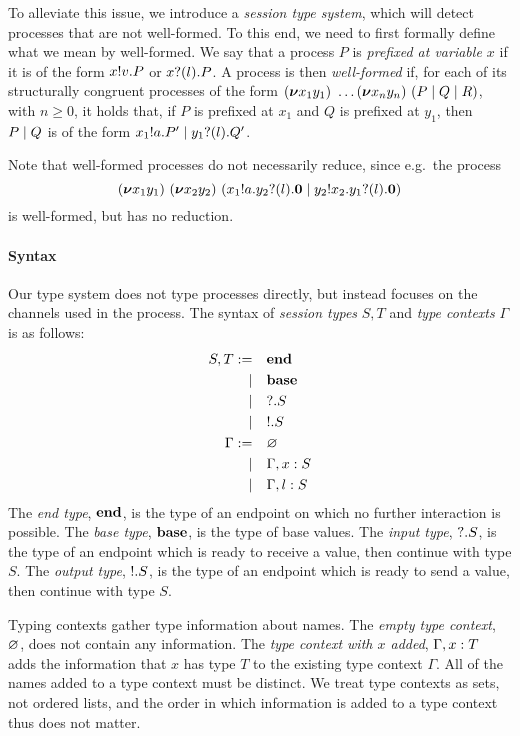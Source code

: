 To alleviate this issue, we introduce a \emph{session type system}, which will detect processes that are not well-formed.
To this end, we need to first formally define what we mean by well-formed.
We say that a process \( P \) is \emph{prefixed at variable \( x \)} if it is of the form \( x ! v . P \) or \( x ? (l) . P \).
A process is then \emph{well-formed} if, for each of its structurally congruent processes of the form \( (\bm{\nu} x_1y_1)~\dots (\bm{\nu} x_ny_n)~(P \mid Q \mid R) \), with \( n \geq 0 \), it holds that, if \( P \) is prefixed at \( x_1 \) and \( Q \) is prefixed at \( y_1 \), then \( P \mid Q \) is of the form \( x_1 ! a . P' \mid y_1 ? (l) . Q' \).

Note that well-formed processes do not necessarily reduce, since e.g.\ the process
\begin{equation*}
  (\bm{\nu} x_1y_1)~(\bm{\nu} x_2y_2)~(x_1 ! a . y_2 ? (l) . \bm{0} \mid y_2 ! x_2 . y_1 ? (l) . \bm{0})
\end{equation*}
is well-formed, but has no reduction.
\paragraph{Syntax}
Our type system does not type processes directly, but instead focuses on the channels used in the process.
The syntax of \emph{session types} \( S, T \) and \emph{type contexts} \( \Gamma \) is as follows:
\begin{align*}
  S,T := &&& \mathbf{end} \\
  |&&& \mathbf{base} \\
  |&&& {?}.S \\
  |&&& {!}.S \\
  \Gamma := &&& \varnothing \\
  |&&& \Gamma, x : S
        \\
  |&&& \Gamma, l : S
\end{align*}
The \emph{end type}, \( \mathbf{end} \), is the type of an endpoint on which no further interaction is possible.
The \emph{base type}, \( \mathbf{base} \), is the type of base values.
The \emph{input type}, \( {?}.S \), is the type of an endpoint which is ready to receive a value, then continue with type \( S \).
The \emph{output type}, \( {!}.S \), is the type of an endpoint which is ready to send a value, then continue with type \( S \).

Typing contexts gather type information about names.
The \emph{empty type context}, \( \varnothing \), does not contain any information.
The \emph{type context with \( x \) added}, \( \Gamma, x : T \) adds the information that \( x \) has type \( T \) to the existing type context \( \Gamma \).
All of the names added to a type context must be distinct.
We treat type contexts as sets, not ordered lists, and the order in which information is added to a type context thus does not matter.

